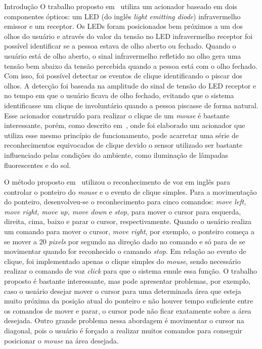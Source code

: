\begin{chapter}{Introdução}
O trabalho proposto em~\cite{Skim10} utiliza um acionador baseado em dois
componentes ópticos: um LED (do inglês \textit{light emitting diode}) infravermelho
emissor e um receptor. Os LEDs foram posicionados bem próximos a um dos
olhos do usuário e através do valor da tensão no LED infravermelho receptor foi
possível identificar se a pessoa estava de olho aberto ou fechado. Quando o
usuário está de olho aberto, o sinal infravermelho refletido no olho gera uma
tensão bem abaixo da tensão percebida quando a pessoa está com o olho fechado.
Com isso, foi possível detectar os eventos de clique identificando o piscar dos
olhos. A detecção foi baseada na amplitude do sinal de tensão do LED receptor e
no tempo em que o usuário ficava de olho fechado, evitando que o sistema
identificasse um clique de involuntário quando a pessoa piscasse de forma
natural. Esse acionador construído para realizar o clique de um \textit{mouse} é
bastante interessante, porém, como descrito em~\cite{Batista17}, onde foi
elaborado um acionador que utiliza esse mesmo princípio de funcionamento, pode
acarretar uma série de reconhecimentos equivocados de clique devido o sensor
utilizado ser bastante influenciado pelas condições do ambiente, como iluminação
de lâmpadas fluorescentes e do sol.

O método proposto em~\cite{Karimullah02} utilizou o reconhecimento de voz em
inglês para controlar o ponteiro do \textit{mouse} e o evento de clique simples.
Para a movimentação do ponteiro, desenvolveu-se o reconhecimento para cinco
comandos: \textit{move left, move right, move up, move down} e \textit{stop},
para mover o cursor para esquerda, direita, cima, baixo e parar o cursor,
respectivamente. Quando o usuário realiza um comando para mover o cursor,
\textit{move right}, por exemplo, o ponteiro começa a se mover a 20
\textit{pixels} por segundo na direção dado no comando e só para de se
movimentar quando for reconhecido o camando \textit{stop}. Em relação ao evento
de clique, foi implementado apenas o clique simples do \textit{mouse}, sendo
necessário realizar o comando de voz \textit{click} para que o sistema emule
essa função. O trabalho proposto é bastante interessante, mas pode apresentar
problemas, por exemplo, caso o usuário desejar mover o cursor para uma
determinada área que esteja muito próxima da posição atual do ponteiro e não
houver tempo suficiente entre os comandos de mover e parar, o cursor pode não
ficar exatamente sobre a área desejada. Outro grande problema nessa abordagem é
movimentar o cursor na diagonal, pois o usuário é forçado a realizar muitos
comandos para conseguir posicionar o \textit{mouse} na área desejada.   


\end{chapter}
